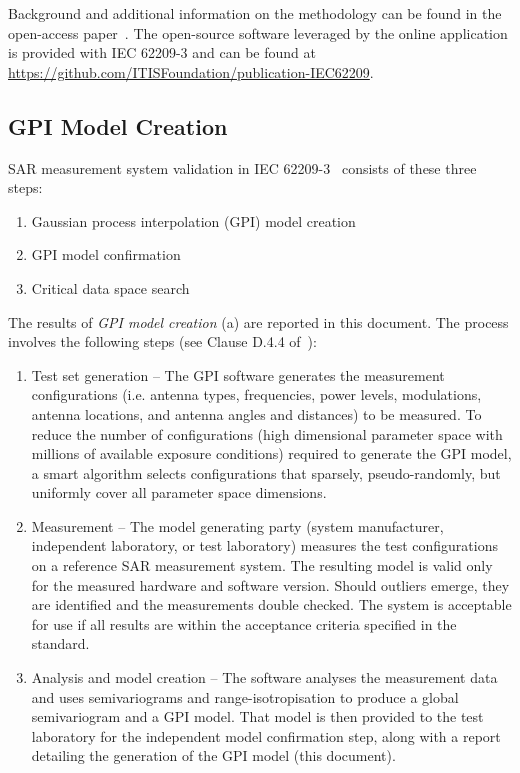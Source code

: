 \documentclass{article}
\begin{document}
Background and additional information on the methodology can be found in the open-access paper~\cite{gpi-paper}. The open-source software leveraged by the online application is provided with IEC 62209-3 and can be found at
\url{https://github.com/ITISFoundation/publication-IEC62209}.


\subsection{GPI Model Creation}\label{sec:procedure}
SAR measurement system validation in IEC 62209-3~\cite{standard} consists of these three steps:

\begin{enumerate}[label=\alph*)]
\item Gaussian process interpolation (GPI) model creation
\item GPI model confirmation
\item Critical data space search
\end{enumerate}

The results of \textit{GPI model creation} (a) are reported in this document. The process involves the following steps (see Clause D.4.4 of~\cite{standard}):

\begin{enumerate}[label=\arabic*)]
\item Test set generation -- The GPI software generates the measurement configurations (i.e. antenna types, frequencies, power levels, modulations, antenna locations, and antenna angles and distances) to be measured. To reduce the number of configurations (high dimensional parameter space with  millions of available exposure conditions) required to generate the GPI model, a smart algorithm selects configurations that sparsely, pseudo-randomly, but uniformly cover all parameter space dimensions.
\item Measurement -- The model generating party (system manufacturer, independent laboratory, or test laboratory) measures the test configurations on a reference SAR measurement system. The resulting model is valid only for the measured hardware and software version. Should outliers emerge, they are identified and the measurements double checked. The system is acceptable for use if all results are within the acceptance criteria specified in the standard.
\item Analysis and model creation -- The software analyses the measurement data and uses semivariograms and range-isotropisation to produce a global semivariogram and a GPI model. That model is then provided to the test laboratory for the independent model confirmation step, along with a report detailing the generation of the GPI model (this document).
\end{enumerate}
\end{document}
